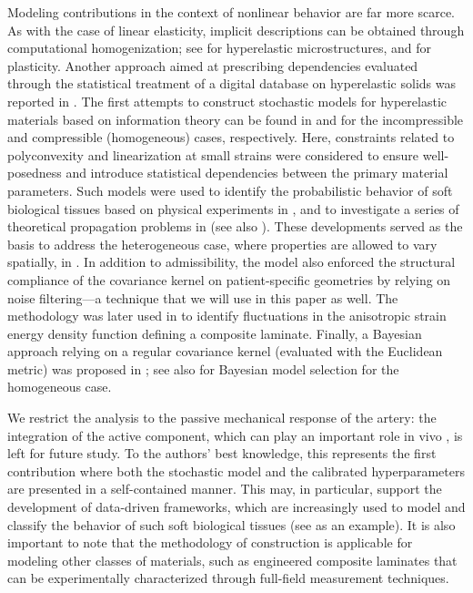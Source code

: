 Modeling contributions in the context of nonlinear behavior are far more scarce. As with the case of linear elasticity, implicit descriptions can be obtained through computational homogenization; see \cite{Clement2012,Clement2013} for hyperelastic microstructures, and \cite{OZTURK2021104294} for plasticity. Another approach aimed at prescribing dependencies evaluated through the statistical treatment of a digital database on hyperelastic solids was reported in \cite{caylak2018stochastic}. The first attempts to construct stochastic models for hyperelastic materials based on information theory can be found in \cite{staber2015stochastic} and \cite{Staber2017zamm} for the incompressible and compressible (homogeneous) cases, respectively. Here, constraints related to polyconvexity and linearization at small strains were considered to ensure well-posedness and introduce statistical dependencies between the primary material parameters. Such models were used to identify the probabilistic behavior of soft biological tissues based on physical experiments in \cite{STABER2017743}, and to investigate a series of theoretical propagation problems in \cite{Mihai-1, Mihai-2, Mihai-3, Mihai-4} (see also \cite{mihai2018stochastic}). These developments served as the basis to address the heterogeneous case, where properties are allowed to vary spatially, in \cite{STABER201894}. In addition to admissibility, the model also enforced the structural compliance of the covariance kernel on patient-specific geometries by relying on noise filtering---a technique that we will use in this paper as well. The methodology was later used in \cite{staber2019stochastic} to identify fluctuations in the anisotropic strain energy density function defining a composite laminate. Finally, a Bayesian approach relying on a regular covariance kernel (evaluated with the Euclidean metric) was proposed in \cite{Biehler2015}; see also \cite{fitt2019uncertainty} for Bayesian model selection for the homogeneous case. 

We restrict the analysis to the passive mechanical response of the artery: the integration of the active component, which can play an important role in vivo \cite{YOSIBASH201251}, is left for future study. To the authors' best knowledge, this represents the first contribution where both the stochastic model and the calibrated hyperparameters are presented in a self-contained manner. This may, in particular, support the development of data-driven frameworks, which are increasingly used to model and classify the behavior of such soft biological tissues (see \cite{Holzapfel2021} as an example). It is also important to note that the methodology of construction is applicable for modeling other classes of materials, such as engineered composite laminates that can be experimentally characterized through full-field measurement techniques.

